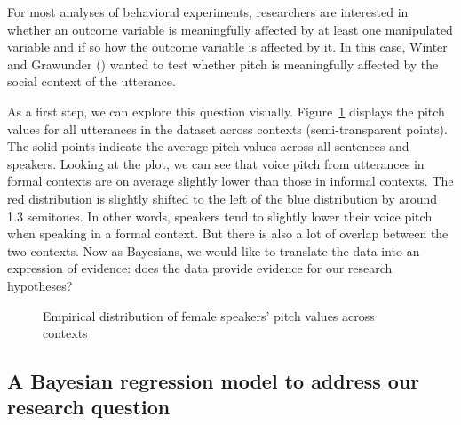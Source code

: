 \documentclass[
  doc,
  floatsintext,
  longtable,
  nolmodern,
  notxfonts,
  notimes,
  colorlinks=true,linkcolor=blue,citecolor=blue,urlcolor=blue]{apa7}
\begin{document}
For most analyses of behavioral experiments, researchers are interested
in whether an outcome variable is meaningfully affected by at least one
manipulated variable and if so how the outcome variable is affected by
it. In this case, Winter and Grawunder
()
wanted to test whether pitch is meaningfully affected by the social
context of the utterance.

As a first step, we can explore this question visually.
Figure~\ref{fig-descriptive-dataviz} displays the pitch values for all
utterances in the dataset across contexts (semi-transparent points). The
solid points indicate the average pitch values across all sentences and
speakers. Looking at the plot, we can see that voice pitch from
utterances in formal contexts are on average slightly lower than those
in informal contexts. The red distribution is slightly shifted to the
left of the blue distribution by around 1.3 semitones. In other words,
speakers tend to slightly lower their voice pitch when speaking in a
formal context. But there is also a lot of overlap between the two
contexts. Now as Bayesians, we would like to translate the data into an
expression of evidence: does the data provide evidence for our research
hypotheses?

\begin{figure}[!tbph]

\caption{\label{fig-descriptive-dataviz}Empirical distribution of female
speakers' pitch values across contexts}


\end{figure}%

\subsection{A Bayesian regression model to address our research
question}\label{a-bayesian-regression-model-to-address-our-research-question}
\end{document}
